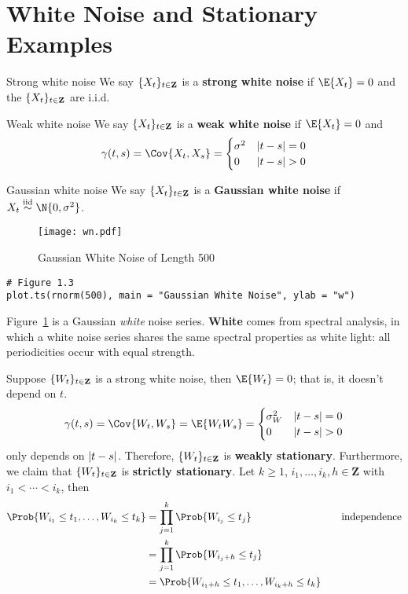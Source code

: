 \section{White Noise and Stationary Examples}
\begin{Definition}{Strong white noise}{}
    We say $ \{X_t\}_{t\in\mathbf{Z}} $ is a
    \textbf{strong white noise} if $ \E{X_t}=0 $
    and the $ \{X_t\}_{t\in\mathbf{Z}} $ are i.i.d.
\end{Definition}
\begin{Definition}{Weak white noise}{}
    We say $ \{X_t\}_{t\in\mathbf{Z}} $ is a
    \textbf{weak white noise} if $ \E{X_t}=0 $
    and
    \[ \gamma(t,s)=\Cov{X_t,X_s}=\begin{cases}
            \sigma^2 & \abs{t-s}=0 \\
            0        & \abs{t-s}>0
        \end{cases} \]
\end{Definition}
\begin{Definition}{Gaussian white noise}{}
    We say $ \{X_t\}_{t\in\mathbf{Z}} $ is a
    \textbf{Gaussian white noise}
    if $ X_t\stackrel{\text{iid}}{\sim}\N{0,\sigma^2} $.
\end{Definition}
\begin{figure}[!htbp]
    \centering
    \texttt{[image: wn.pdf]}
    \caption{Gaussian White Noise of Length 500}\label{fig:wn}
\end{figure}
\begin{verbatim}
# Figure 1.3
plot.ts(rnorm(500), main = "Gaussian White Noise", ylab = "w")
\end{verbatim}
Figure~\ref{fig:wn} is a Gaussian \emph{white} noise series.
\textbf{White} comes from spectral analysis,
in which a white noise series shares the same spectral properties as white light:
all periodicities occur with equal strength.
\begin{Example}{}{}
    Suppose $ \{W_t\}_{t\in\mathbf{Z}} $
    is a strong white noise, then $ \E{W_t}=0 $;
    that is, it doesn't depend on $ t $.
    \[ \gamma(t,s)=\Cov{W_t,W_s}=\E{W_t W_s}=
        \begin{cases}
            \sigma_W^2 & \abs{t-s}=0 \\
            0          & \abs{t-s}>0
        \end{cases} \]
    only depends on $ \lvert t-s\rvert $. Therefore,
    $ \{W_t\}_{t\in\mathbf{Z}} $ is
    \textbf{weakly stationary}. Furthermore,
    we claim that
    $ \{W_t\}_{t\in\mathbf{Z}} $ is
    \textbf{strictly stationary}. Let $ k\ge 1 $,
    $ i_1,\ldots,i_k,h\in\mathbf{Z} $ with $ i_1<\cdots<i_k $, then
    \begin{align*}
        \Prob{W_{i_1}\le t_1,\ldots,W_{i_k}\le t_k}
         & =\prod_{j=1}^k\Prob{W_{i_j}\le t_j}                   & \quad & \text{independence} \\
         & =\prod_{j=1}^k\Prob{W_{{i_j}+h}\le t_j}                                             \\
         & =\Prob{W_{{i_1}+h}\le t_1,\ldots, W_{{i_k}+h}\le t_k}
    \end{align*}
\end{Example}

